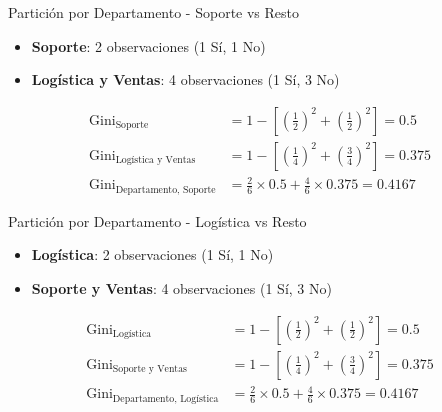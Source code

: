 \documentclass{beamer}
\begin{document}
\begin{frame}{Partición por Departamento - Soporte vs Resto}
    \begin{itemize}
        \item \textbf{Soporte}: 2 observaciones (1 Sí, 1 No)
        \item \textbf{Logística y Ventas}: 4 observaciones (1 Sí, 3 No)
    \end{itemize}
    
    \vspace{0.5em}
    
    \begin{align*}
        \mathrm{Gini}_{\text{Soporte}} &= 1 - \left[\left(\tfrac{1}{2}\right)^2 + \left(\tfrac{1}{2}\right)^2\right] = 0.5 \\
        \mathrm{Gini}_{\text{Logística y Ventas}} &= 1 - \left[\left(\tfrac{1}{4}\right)^2 + \left(\tfrac{3}{4}\right)^2\right] = 0.375 \\
        \mathrm{Gini}_{\text{Departamento, Soporte}} &= \tfrac{2}{6}\times0.5 + \tfrac{4}{6}\times0.375 = 0.4167
    \end{align*}
\end{frame}

\begin{frame}{Partición por Departamento - Logística vs Resto}
    \begin{itemize}
        \item \textbf{Logística}: 2 observaciones (1 Sí, 1 No)
        \item \textbf{Soporte y Ventas}: 4 observaciones (1 Sí, 3 No)
    \end{itemize}
    
    \vspace{0.5em}

    \begin{align*}
        \mathrm{Gini}_{\text{Logística}} &= 1 - \left[\left(\tfrac{1}{2}\right)^2 + \left(\tfrac{1}{2}\right)^2\right] = 0.5 \\
        \mathrm{Gini}_{\text{Soporte y Ventas}} &= 1 - \left[\left(\tfrac{1}{4}\right)^2 + \left(\tfrac{3}{4}\right)^2\right] = 0.375 \\
        \mathrm{Gini}_{\text{Departamento, Logística}} &= \tfrac{2}{6}\times0.5 + \tfrac{4}{6}\times0.375 = 0.4167
    \end{align*}
\end{frame}
\end{document}
